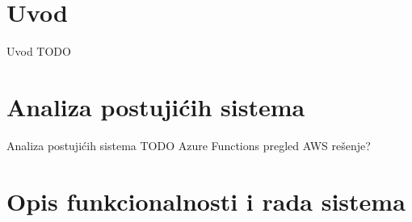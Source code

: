 \documentclass[12pt,oneside]{memoir}
\begin{document}
\frontmatter
\naslovna
\komisija
\apstrakt
\tableofcontents*

\mainmatter

\chapter{Uvod}
Uvod TODO



\chapter{Analiza postujićih sistema}
\label{chp:analizapostojucihsistema}

Analiza postujićih sistema TODO
Azure Functions pregled
AWS rešenje?

\chapter{Opis funkcionalnosti i rada sistema}
\label{chp:opisfunkc}
\end{document}
